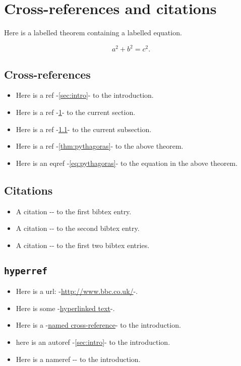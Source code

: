 
\section{Cross-references and citations}
\label{sec:links}

Here is a labelled theorem containing a labelled equation.
\begin{theo}\label{thm:pythagoras}
\begin{equation}\label{eq:pythagoras}
a^2 + b^2 = c^2.
\end{equation}
\end{theo}

\subsection{Cross-references}
\label{ss:xrefs}
\begin{itemize}
\item Here is a ref -\ref{sec:intro}- to the introduction.
\item Here is a ref -\ref{sec:links}- to the current section.
\item Here is a ref -\ref{ss:xrefs}- to the current subsection.
\item Here is a ref -\ref{thm:pythagoras}- to the above theorem.
\item Here is an eqref -\eqref{eq:pythagoras}- to the equation in the above theorem.
\end{itemize}

\subsection{Citations}
\begin{itemize}
\item A citation -\cite{grimmett01}- to the first bibtex entry.
\item A citation -\cite{hogg05}- to the second bibtex entry.
\item A citation -\cite{grimmett01,hogg05}- to the first two bibtex entries.
\end{itemize}

\subsection{\tt hyperref}
\begin{itemize}
\item Here is a url: -\url{http://www.bbc.co.uk/}-.
\item Here is some -\href{http://www.bbc.co.uk/}{hyperlinked text}-.
\item Here is a -\hyperref[sec:intro]{named cross-reference}- to the introduction.
\item here is an autoref -\autoref{sec:intro}- to the introduction.
\item Here is a nameref -- to the introduction.
\end{itemize}

